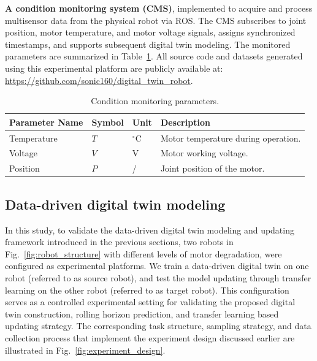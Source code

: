 \documentclass[a4paper,10pt]{cas-sc}%
\begin{document}
\textbf{A condition monitoring system (CMS)}, implemented to acquire and process multisensor data from the physical robot via ROS.
The CMS subscribes to joint position, motor temperature, and motor voltage signals, assigns synchronized timestamps, and supports subsequent digital twin modeling.
The monitored parameters are summarized in Table~\ref{tab:cms_parameters}. All source code and datasets generated using this experimental platform are publicly available at:
\url{https://github.com/sonic160/digital_twin_robot}.

\begin{table}[htbp]
	\centering
	\caption{Condition monitoring parameters.}
	\label{tab:cms_parameters}
	\begin{tabular}{p{}p{}p{}p{}}
		\toprule
		\textbf{Parameter Name} & \textbf{Symbol} & \textbf{Unit}       & \textbf{Description}                \\
		\midrule
		Temperature             & $T$             & $\mathrm{^\circ C}$ & Motor temperature during operation. \\
		Voltage                 & $V$             & V                   & Motor working voltage.              \\
		Position                & $P$             & /                   & Joint position of the motor.        \\
		\bottomrule
	\end{tabular}
\end{table}



%
%
\subsection{Data-driven digital twin modeling}\label{sec:5.2}

In this study, to validate the data-driven digital twin modeling and updating framework introduced in the previous sections, two robots in Fig.~\ref{fig:robot_structure} with different levels of motor degradation, were configured as experimental platforms. We train a data-driven digital twin on one robot (referred to as source robot), and test the model updating through transfer learning on the other robot (referred to as target robot). This configuration serves as a controlled experimental setting for validating the proposed digital twin construction, rolling horizon prediction, and transfer learning based updating strategy. The corresponding task structure, sampling strategy, and data collection process that implement the experiment design discussed earlier are illustrated in Fig.~\ref{fig:experiment_design}.
\end{document}
